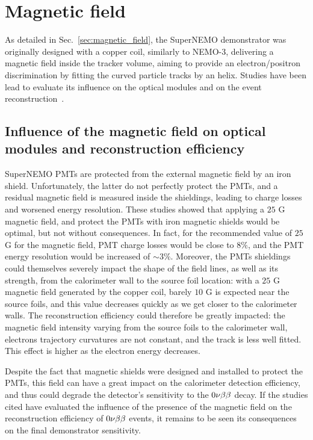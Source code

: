 \section{Magnetic field}

As detailed in Sec.~\ref{sec:magnetic_field}, the SuperNEMO demonstrator was originally designed with a copper coil, similarly to NEMO-$3$, delivering a magnetic field inside the tracker volume, aiming to provide an electron/positron discrimination by fitting the curved particle tracks by an helix.
Studies have been lead to evaluate its influence on the optical modules and on the event reconstruction~\cite{CalvezThesis}\cite{internal:magnetic_field}.


\subsection{Influence of the magnetic field on optical modules and reconstruction efficiency}

SuperNEMO PMTs are protected from the external magnetic field by an iron shield.
Unfortunately, the latter do not perfectly protect the PMTs, and a residual magnetic field is measured inside the shieldings, leading to charge losses and worsened energy resolution.
These studies showed that applying a $25$ G magnetic field, and protect the PMTs with iron magnetic shields would be optimal, but not without consequences.
In fact, for the recommended value of $25$ G for the magnetic field, PMT charge losses would be close to $8\%$, and the PMT energy resolution would be increased of $\sim 3\%$.
Moreover, the PMTs shieldings could themselves severely impact the shape of the field lines, as well as its strength, from the calorimeter wall to the source foil location: with a $25$ G magnetic field generated by the copper coil, barely $10$ G is expected near the source foils, and this value decreases quickly as we get closer to the calorimeter walls.
The reconstruction efficiency could therefore be greatly impacted:
the magnetic field intensity varying from the source foils to the calorimeter wall, electrons trajectory curvatures are not constant, and the track is less well fitted.
This effect is higher as the electron energy decreases.

Despite the fact that magnetic shields were designed and installed to protect the PMTs, this field can have a great impact on the calorimeter detection efficiency, and thus could degrade the detector's sensitivity to the $0\nu\beta\beta$ decay.
If the studies cited have evaluated the influence of the presence of the magnetic field on the reconstruction efficiency of $0\nu\beta\beta$ events, it remains to be seen its consequences on the final demonstrator sensitivity.

